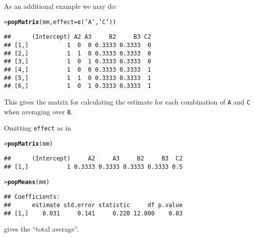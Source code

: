 \documentclass[11pt]{article}\usepackage[]{graphicx}\usepackage[]{color}
\makeatletter
\newcommand{\hlstr}[1]{\textcolor[rgb]{0.192,0.494,0.8}{#1}}%
\newcommand{\hlstd}[1]{\textcolor[rgb]{0.345,0.345,0.345}{#1}}%
\newcommand{\hlkwc}[1]{\textcolor[rgb]{0.333,0.667,0.333}{#1}}%
\newcommand{\hlkwd}[1]{\textcolor[rgb]{0.737,0.353,0.396}{\textbf{#1}}}%
\newenvironment{kframe}{%
 \def\at@end@of@kframe{}%
 \ifinner\ifhmode%
  \def\at@end@of@kframe{\end{minipage}}%
  \begin{minipage}{\columnwidth}%
 \fi\fi%
 \def\FrameCommand##1{\hskip\@totalleftmargin \hskip-\fboxsep
 \colorbox{shadecolor}{##1}\hskip-\fboxsep
     \hskip-\linewidth \hskip-\@totalleftmargin \hskip\columnwidth}%
 \MakeFramed {\advance\hsize-\width
   \@totalleftmargin\z@ \linewidth\hsize
   \@setminipage}}%
 {\par\unskip\endMakeFramed%
 \at@end@of@kframe}
\newenvironment{knitrout}{}{} %
\def\code#1{\texttt{#1}}
\renewenvironment{knitrout}{
  \begin{oldknitrout}
    \footnotesize
    \topsep=0pt
}{
  \end{oldknitrout}
}
\makeatother
\begin{document}
As an additional example we may do:

\begin{knitrout}
\color{fgcolor}\begin{kframe}
\begin{alltt}
\hlstd{> }\hlkwd{popMatrix}\hlstd{(mm,}\hlkwc{effect}\hlstd{=}\hlkwd{c}\hlstd{(}\hlstr{'A'}\hlstd{,}\hlstr{'C'}\hlstd{))}
\end{alltt}
\begin{verbatim}
##      (Intercept) A2 A3     B2     B3 C2
## [1,]           1  0  0 0.3333 0.3333  0
## [2,]           1  1  0 0.3333 0.3333  0
## [3,]           1  0  1 0.3333 0.3333  0
## [4,]           1  0  0 0.3333 0.3333  1
## [5,]           1  1  0 0.3333 0.3333  1
## [6,]           1  0  1 0.3333 0.3333  1
\end{verbatim}
\end{kframe}
\end{knitrout}
This gives the matrix for calculating the estimate for each
combination of \code{A} and \code{C} when averaging over \code{B}.

Omitting \code{effect} as in

\begin{knitrout}
\color{fgcolor}\begin{kframe}
\begin{alltt}
\hlstd{> }\hlkwd{popMatrix}\hlstd{(mm)}
\end{alltt}
\begin{verbatim}
##      (Intercept)     A2     A3     B2     B3  C2
## [1,]           1 0.3333 0.3333 0.3333 0.3333 0.5
\end{verbatim}
\begin{alltt}
\hlstd{> }\hlkwd{popMeans}\hlstd{(mm)}
\end{alltt}
\begin{verbatim}
## Coefficients:
##      estimate std.error statistic     df p.value
## [1,]    0.031     0.141     0.220 12.000    0.83
\end{verbatim}
\end{kframe}
\end{knitrout}
gives the ``total average''.



\end{document}
